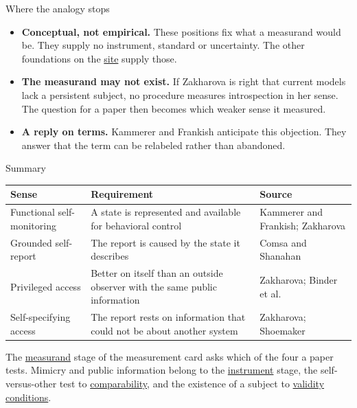 \documentclass[aspectratio=169,11pt]{beamer}
\newcommand{\partslide}[2]{%
\begin{frame}[plain,label=#1]
\vfill
\begin{center}
  \setlength{\fboxrule}{2.5pt}%
  \fcolorbox{black}{white}{\parbox{0.65\textwidth}{\centering\vspace{0.8em}
    {\Large\bfseries #2}
  \vspace{0.8em}}}
\end{center}
\vfill
\end{frame}}
\newcommand{\site}{https://measuring-introspection.github.io/measuring-introspection}
\begin{document}
\partslide{part6}{Part 6\\[0.5em]{\large\mdseries Limits}}

\begin{frame}[label=limits]{Where the analogy stops}
\begin{itemize}\setlength\itemsep{10pt}
  \item {\small \textbf{Conceptual, not empirical.} These positions fix what a measurand would be. They supply no instrument, standard or uncertainty. The other foundations on the \href{\site/}{site} supply those.}
  \item {\small \textbf{The measurand may not exist.} If Zakharova is right that current models lack a persistent subject, no procedure measures introspection in her sense. The question for a paper then becomes which weaker sense it measured.}
  \item {\small \textbf{A reply on terms.} Kammerer and Frankish anticipate this objection. They answer that the term can be relabeled rather than abandoned.}
\end{itemize}
\end{frame}

\begin{frame}[label=summary]{Summary}
\begin{center}
{\footnotesize\renewcommand{\arraystretch}{1.15}
\begin{tabular}{L{3.0cm}L{6.3cm}L{3.3cm}}
\toprule
\textbf{Sense} & \textbf{Requirement} & \textbf{Source} \\
\midrule
Functional self-monitoring & A state is represented and available for behavioral control & Kammerer and Frankish; Zakharova \\
Grounded self-report & The report is caused by the state it describes & Comsa and Shanahan \\
Privileged access & Better on itself than an outside observer with the same public information & Zakharova; Binder et al. \\
Self-specifying access & The report rests on information that could not be about another system & Zakharova; Shoemaker \\
\bottomrule
\end{tabular}
}
\end{center}

\vspace{0.2em}
{\footnotesize The \href{\site/measurement-card/measurand/}{measurand} stage of the measurement card asks which of the four a paper tests. Mimicry and public information belong to the \href{\site/measurement-card/instrument/}{instrument} stage, the self-versus-other test to \href{\site/measurement-card/comparability/}{comparability}, and the existence of a subject to \href{\site/measurement-card/validity-conditions/}{validity conditions}.}
\end{frame}
\end{document}
